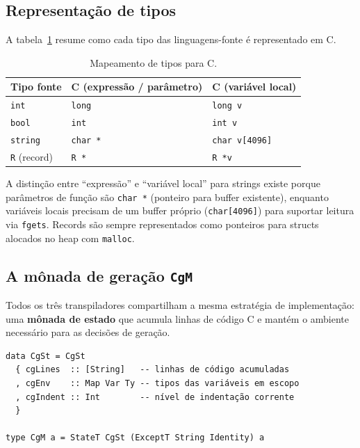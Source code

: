 \subsection{Representação de tipos}

A tabela~\ref{tab:tipo-c} resume como cada tipo das linguagens-fonte é
representado em C.

\begin{table}[htbp]
\centering
\begin{tabular}{lll}
\hline
\textbf{Tipo fonte} & \textbf{C (expressão / parâmetro)} & \textbf{C (variável local)} \\
\hline
\texttt{int}        & \texttt{long}    & \texttt{long v}         \\
\texttt{bool}       & \texttt{int}     & \texttt{int v}          \\
\texttt{string}     & \texttt{char *}  & \texttt{char v[4096]}   \\
\texttt{R} (record) & \texttt{R *}     & \texttt{R *v}           \\
\hline
\end{tabular}
\caption{Mapeamento de tipos para C.}\label{tab:tipo-c}
\end{table}

A distinção entre ``expressão'' e ``variável local'' para strings existe porque
parâmetros de função são \texttt{char *} (ponteiro para buffer existente),
enquanto variáveis locais precisam de um buffer próprio (\texttt{char[4096]})
para suportar leitura via \texttt{fgets}.  Records são sempre representados
como ponteiros para structs alocados no heap com \texttt{malloc}.

\subsection{A mônada de geração \texttt{CgM}}

Todos os três transpiladores compartilham a mesma estratégia de
implementação: uma \textbf{mônada de estado} que acumula linhas de código C
e mantém o ambiente necessário para as decisões de geração.

\begin{verbatim}
data CgSt = CgSt
  { cgLines  :: [String]   -- linhas de código acumuladas
  , cgEnv    :: Map Var Ty -- tipos das variáveis em escopo
  , cgIndent :: Int        -- nível de indentação corrente
  }

type CgM a = StateT CgSt (ExceptT String Identity) a
\end{verbatim}

